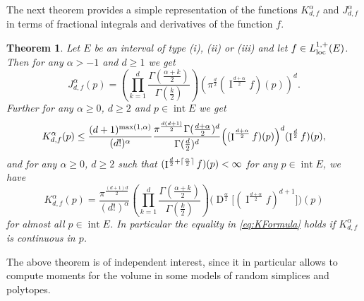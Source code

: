 \documentclass[11pt,a4paper]{article}
\theoremstyle{plain}
\newtheorem{theorem}{Theorem}[section]
\theoremstyle{definition}
\theoremstyle{remark}
\newcommand{\frI}{\mathop{\mathrm{I}}\nolimits}
\newcommand{\frD}{\mathop{\mathrm{D}}\nolimits}
\newcommand{\inter}{\operatorname{int}}
\begin{document}
The next theorem provides a simple representation of the functions $K_{d,f}^{\alpha}$ and $J_{d,f}^{\alpha}$ in terms of fractional integrals and derivatives of the function $f$.

\begin{theorem}\label{thm:kd_jd}
    Let $E$ be an interval of type (i), (ii) or (iii) and let $f\in L_{\rm loc}^{1,+}(E)$. Then for any $\alpha> -1$ and $d\ge 1$ we get
    \begin{equation}\label{eq:JFormula}
        J_{d,f}^\alpha(p)= \left(\prod_{k=1}^{d}\frac{\Gamma\left(\frac{\alpha+k}{2}\right)}{\Gamma(\frac{k}{2})}\right) \left(\pi^{\frac{d}{2}}(\frI^{\frac{d+\alpha}{2}}f)(p)\right)^d.
    \end{equation}
    Further for any $\alpha\ge 0$, $d\ge 2$ and $p\in\inter E$ we get
    \begin{equation}\label{eq:KInequality}
        K_{d,f}^\alpha(p)\leq {(d+1)^{\max(1,\alpha)}\over (d!)^{\alpha}}{\pi^{d(d+1)\over 2}\Gamma({d+\alpha\over 2})^d\over \Gamma({d\over 2})^d}\Big((\frI^{{d+\alpha\over 2}}f)(p)\Big)^d(\frI^{{d\over 2}}f)(p),
    \end{equation}
    and for any $\alpha\ge 0$, $d\ge 2$ such that $(\frI^{{d\over 2}+\lceil{\alpha\over 2}\rceil}f)(p)<\infty$ for any $p\in\inter E$, we have
    \begin{equation}\label{eq:KFormula}
        K_{d,f}^\alpha(p)=\frac{\pi^{\frac{(d+1)d}{2}}}{(d!)^\alpha} \left(\prod_{k=1}^{d}\frac{\Gamma\left(\frac{\alpha+k}{2}\right)}{\Gamma(\frac{k}{2})}\right)\Big(\frD^{\frac{\alpha}{2}}\big[(\frI^{\frac{d+\alpha}{2}}f)^{d+1}\big]\Big)(p)
    \end{equation}
    for almost all $p\in\inter E$. In particular the equality in \eqref{eq:KFormula} holds if $K_{d,f}^{\alpha}$ is continuous in $p$.
\end{theorem}

The above theorem is of independent interest, since it in particular allows to compute moments for the volume in some models of random simplices and polytopes.
\end{document}
